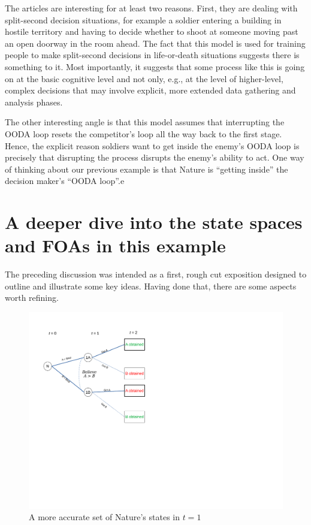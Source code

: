 \documentclass[
11pt,
titlepage,
reqno,
]{article}%
\theoremstyle{definition}
\begin{document}
The articles are interesting for at least two reasons. First, they are dealing with split-second decision situations, for example a soldier entering a building in hostile territory and having to decide whether to shoot at someone moving past an open doorway in the room ahead. The fact that this model is used for training people to make split-second decisions in life-or-death situations suggests there is something to it. Most importantly, it suggests that some process like this is going on at the basic cognitive level and not only, e.g., at the level of higher-level, complex decisions that may involve explicit, more extended data gathering and analysis phases. 

The other interesting angle is that this model assumes that interrupting the OODA loop resets the competitor's loop all the way back to the first stage. Hence, the explicit reason soldiers want to get inside the enemy's OODA loop is precisely that disrupting the process disrupts the enemy's ability to act. One way of thinking about our previous example is that Nature is ``getting inside'' the decision maker's ``OODA loop''.e

\section*{A deeper dive into the state spaces and FOAs in this example}
The preceding discussion was intended as a first, rough cut exposition designed to outline and illustrate some key ideas. Having done that, there are some aspects worth refining.  

\begin{figure}[h!]
	\centering
	\includegraphics*[page=15,trim = 0in 7in 6in 0in,scale=1]{Awareness_Diagrams_All}
	\caption{A more accurate set of Nature's states in $t=1$\label{Diag: p-15}}%
\end{figure}
\end{document}
